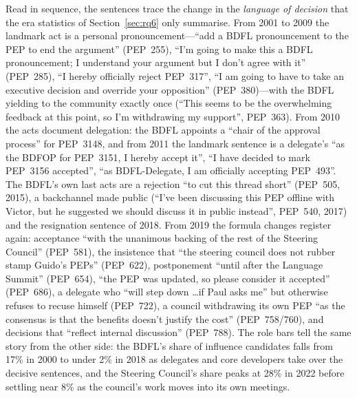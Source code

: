 Read in sequence, the sentences trace the change in the \emph{language of decision} that the era statistics of Section~\ref{sec:rq6} only summarise. From 2001 to 2009 the landmark act is a personal pronouncement---``add a BDFL pronouncement to the PEP to end the argument'' (PEP~255), ``I'm going to make this a BDFL pronouncement; I understand your argument but I don't agree with it'' (PEP~285), ``I hereby officially reject PEP~317'', ``I am going to have to take an executive decision and override your opposition'' (PEP~380)---with the BDFL yielding to the community exactly once (``This seems to be the overwhelming feedback at this point, so I'm withdrawing my support'', PEP~363). From 2010 the acts document delegation: the BDFL appoints a ``chair of the approval process'' for PEP~3148, and from 2011 the landmark sentence is a delegate's ``as the BDFOP for PEP~3151, I hereby accept it'', ``I have decided to mark PEP~3156 accepted'', ``as BDFL-Delegate, I am officially accepting PEP~493''. The BDFL's own last acts are a rejection ``to cut this thread short'' (PEP~505, 2015), a backchannel made public (``I've been discussing this PEP offline with Victor, but he suggested we should discuss it in public instead'', PEP~540, 2017) and the resignation sentence of 2018. From 2019 the formula changes register again: acceptance ``with the unanimous backing of the rest of the Steering Council'' (PEP~581), the insistence that ``the steering council does not rubber stamp Guido's PEPs'' (PEP~622), postponement ``until after the Language Summit'' (PEP~654), ``the PEP was updated, so please consider it accepted'' (PEP~686), a delegate who ``will step down \ldots if Paul asks me'' but otherwise refuses to recuse himself (PEP~722), a council withdrawing its own PEP ``as the consensus is that the benefits doesn't justify the cost'' (PEP~758/760), and decisions that ``reflect internal discussion'' (PEP~788). The role bars tell the same story from the other side: the BDFL's share of influence candidates falls from 17\% in 2000 to under 2\% in 2018 as delegates and core developers take over the decisive sentences, and the Steering Council's share peaks at 28\% in 2022 before settling near 8\% as the council's work moves into its own meetings.

